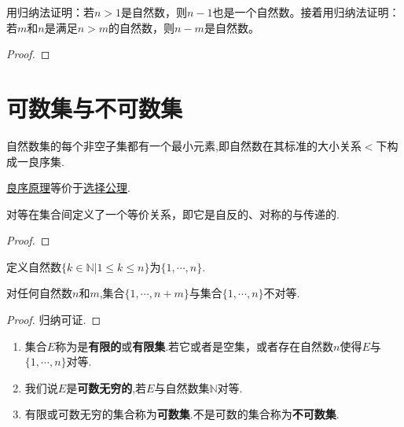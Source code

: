 \documentclass[lang=cn,newtx,10pt,scheme=chinese]{../Template/elegantbook}
\begin{document}
\begin{example}\label{example-9}
用归纳法证明：若\(n > 1\)是自然数，则\(n - 1\)也是一个自然数。接着用归纳法证明：若\(m\)和\(n\)是满足\(n>m\)的自然数，则\(n - m\)是自然数。
\end{example}
\begin{proof}
  
\end{proof}





\section{可数集与不可数集}

\begin{axiom}[良序原理]\label{theorem:良序原理}
  自然数集的每个非空子集都有一个最小元素,即自然数在其标准的大小关系$<$下构成一良序集.
\end{axiom}
\begin{note}
  \hyperref[theorem:良序原理]{良序原理}等价于\hyperref[axiom:Zermelo选择公理]{选择公理}.
\end{note}

\begin{proposition}\label{proposition:集合之间的对等是一个等价关系}
  对等在集合间定义了一个等价关系，即它是自反的、对称的与传递的.
\end{proposition}
\begin{proof}
  
\end{proof}

\begin{definition}[自然数]\label{definition:自然数}
  定义自然数\(\{k\in\mathbb{N}|1\leqslant k\leqslant n\}\)为\(\{1, \cdots, n\}\).
\end{definition}

\begin{theorem}[鸽笼原理]\label{theorem:鸽笼原理}
  对任何自然数\(n\)和\(m\),集合\(\{1, \cdots, n + m\}\)与集合\(\{1, \cdots, n\}\)不对等.
\end{theorem}
\begin{proof}
  归纳可证.
\end{proof}

\begin{definition}[可数集与不可数集]\label{definition:可数集与不可数集}
\begin{enumerate}
  \item 集合\(E\)称为是\textbf{有限的}或\textbf{有限集}.若它或者是空集，或者存在自然数\(n\)使得\(E\)与\(\{1, \cdots, n\}\)对等.
  \item 我们说\(E\)是\textbf{可数无穷的},若\(E\)与自然数集\(\mathbb{N}\)对等.
  \item 有限或可数无穷的集合称为\textbf{可数集}.不是可数的集合称为\textbf{不可数集}.
\end{enumerate}
\end{definition}
\end{document}
